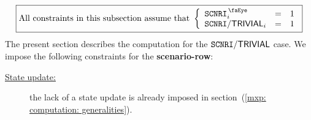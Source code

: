 \[
	\boxed{\text{All constraints in this subsection assume that }
	\left\{ \begin{array}{lcl}
		\isMxpScenario               _{i} & = & 1 \\
		\mxpScenarioTrivialOperation _{i} & = & 1 \\
	\end{array} \right. }
\]
\noindent
The present section describes the computation for the $\texttt{SCNRI}\textsf{/}{\textsf{TRIVIAL}}$ case.
We impose the following constraints for the \textbf{scenario-row}:
\begin{description}
	\item[\underline{\underline{State update:}}]
		the lack of a state update is already imposed in
		section~(\ref{mxp: computation: generalities}).
\end{description}


